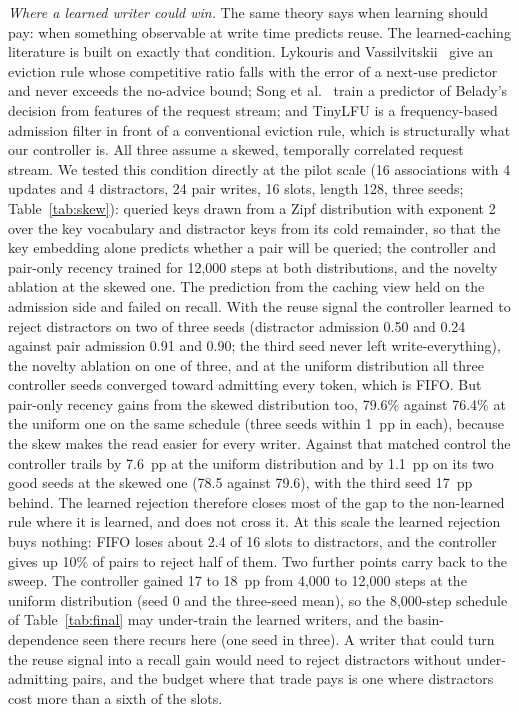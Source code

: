 \documentclass[conference]{IEEEtran}
\begin{document}
\textit{Where a learned writer could win.} The same theory says when
learning should pay: when something observable at write time predicts reuse.
The learned-caching literature is built on exactly that condition. Lykouris
and Vassilvitskii~\cite{lykouris2018competitive} give an eviction rule whose
competitive ratio falls with the error of a next-use predictor and never
exceeds the no-advice bound; Song et al.~\cite{song2020lrb} train a predictor
of Belady's decision from features of the request stream; and TinyLFU
\cite{einziger2017tinylfu} is a frequency-based admission filter in front of
a conventional eviction rule, which is structurally what our controller is.
All three assume a skewed, temporally correlated request stream. We tested
this condition directly at the pilot scale (16 associations with 4 updates
and 4 distractors, 24 pair writes, 16 slots, length 128, three seeds;
Table~\ref{tab:skew}): queried keys drawn from a Zipf distribution with exponent 2
over the key vocabulary and distractor keys from its cold remainder, so that
the key embedding alone predicts whether a pair will be queried; the controller and
pair-only recency trained for 12{,}000 steps at both distributions, and the
novelty ablation at the skewed one.
The prediction from the caching view held on the admission side and failed on
recall. With the reuse signal the controller learned to reject distractors on
two of three seeds (distractor admission 0.50 and 0.24 against pair admission
0.91 and 0.90; the third seed never left write-everything), the novelty
ablation on one of three, and at the uniform distribution all three controller
seeds converged toward admitting every token, which is FIFO. But pair-only
recency gains from the skewed distribution too, 79.6\% against 76.4\% at the
uniform one on the same schedule (three seeds within 1~pp in each), because
the skew makes the read easier for every writer. Against that matched control
the controller trails by 7.6~pp at the uniform distribution and by 1.1~pp on
its two good seeds at the skewed one (78.5 against 79.6), with the third seed
17~pp behind. The learned rejection therefore closes most of the gap to the
non-learned rule where it is learned, and does not cross it. At this scale the
learned rejection buys nothing: FIFO loses about 2.4 of 16 slots to
distractors, and the controller gives up 10\% of pairs to reject half of them.
Two further points carry back to the sweep. The controller gained 17 to 18~pp
from 4{,}000 to 12{,}000 steps at the uniform distribution (seed 0 and the
three-seed mean), so the 8{,}000-step schedule of
Table~\ref{tab:final} may under-train the learned writers, and the
basin-dependence seen there recurs here (one seed in three). A writer that
could turn the reuse signal into a recall gain would need to reject
distractors without under-admitting pairs, and the budget where that trade
pays is one where distractors cost more than a sixth of the slots.
\end{document}
